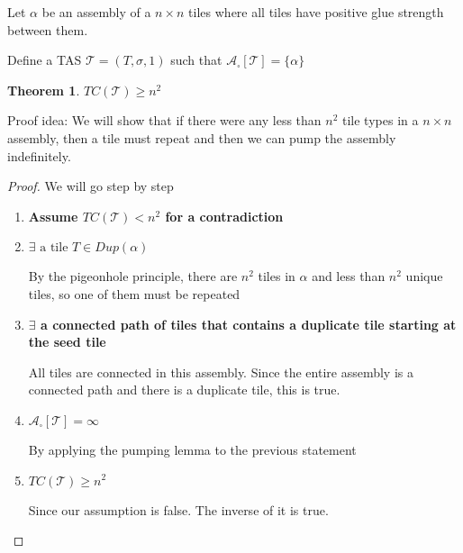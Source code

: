 \documentclass[12pt]{article}
\newtheorem{theorem}{Theorem}
\begin{document}
Let $\alpha$ be an assembly of a $n \times n$ tiles where all tiles have positive glue strength between them.

Define a TAS $\mathcal{T} = (T, \sigma, 1)$ such that $\mathcal{A}_\square[\mathcal{T}] = \{ \alpha \}$


\begin{theorem}
	$TC(\mathcal{T}) \geq n^2$
\end{theorem}

Proof idea: We will show that if there were any less than $n^2$ tile types in a $n \times n$ assembly, then a tile must repeat and then we can pump the assembly indefinitely.

\begin{proof}
	We will go step by step
	\begin{enumerate}
		\item \textbf{Assume $TC(\mathcal{T}) < n^2$ for a contradiction}

		\item \textbf{$\exists \text{ a tile } T \in Dup(\alpha)$ }

		By the pigeonhole principle, there are $n^2$ tiles in $\alpha$ and less than $n^2$ unique tiles, so one of them must be repeated

		\item \textbf{$\exists$ a connected path of tiles that contains a duplicate tile starting at the seed tile}

		All tiles are connected in this assembly. Since the entire assembly is a connected path and there is a duplicate tile, this is true.

		\item \textbf{$\mathcal{A}_\square[\mathcal{T}] = \infty$}

		By applying the pumping lemma to the previous statement

		\item \textbf{$TC(\mathcal{T}) \geq n^2$}

		Since our assumption is false. The inverse of it is true.


	\end{enumerate}
\end{proof}
\end{document}
